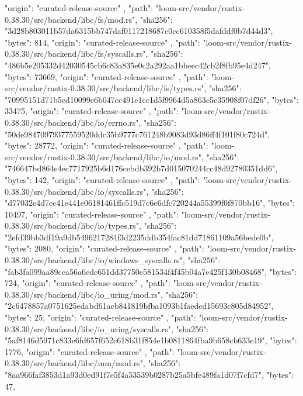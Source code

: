 {{      "origin": "curated-release-source"
    },
    {
      "path": "loom-src/vendor/rustix-0.38.30/src/backend/libc/fs/mod.rs",
      "sha256": "3d28b803011b57da6315bb747daf0117218687c0cc610358f5dafddf0b7d44d3",
      "bytes": 814,
      "origin": "curated-release-source"
    },
    {
      "path": "loom-src/vendor/rustix-0.38.30/src/backend/libc/fs/syscalls.rs",
      "sha256": "486b5e205332d42030545cb6c83a835e0c2a292aa1bbeec42cb2f8fb95e4d247",
      "bytes": 73669,
      "origin": "curated-release-source"
    },
    {
      "path": "loom-src/vendor/rustix-0.38.30/src/backend/libc/fs/types.rs",
      "sha256": "70995151d71b5ed10099e6b047cc491e1cc1d5f9964d5a863c5c35908f07df26",
      "bytes": 33475,
      "origin": "curated-release-source"
    },
    {
      "path": "loom-src/vendor/rustix-0.38.30/src/backend/libc/io/errno.rs",
      "sha256": "50de98470979377559520ddc35b9777c761248b9083d93d86ff4f101f80c724d",
      "bytes": 28772,
      "origin": "curated-release-source"
    },
    {
      "path": "loom-src/vendor/rustix-0.38.30/src/backend/libc/io/mod.rs",
      "sha256": "746647bd864e4ec7717925b6d176cebdb392b7d015070244cc48d92780351dd6",
      "bytes": 142,
      "origin": "curated-release-source"
    },
    {
      "path": "loom-src/vendor/rustix-0.38.30/src/backend/libc/io/syscalls.rs",
      "sha256": "d77032e4d7ec41e441e06181461ffc519d7c6e6dfc720244a55399f0f870bb16",
      "bytes": 10497,
      "origin": "curated-release-source"
    },
    {
      "path": "loom-src/vendor/rustix-0.38.30/src/backend/libc/io/types.rs",
      "sha256": "2efd39bb3df19a9db5496217284f3d2235ddb354fac81dd71861109a56bede0b",
      "bytes": 2080,
      "origin": "curated-release-source"
    },
    {
      "path": "loom-src/vendor/rustix-0.38.30/src/backend/libc/io/windows_syscalls.rs",
      "sha256": "fab3fa099aa89cea56a6edc651dd37750e581534f4f45b04a7e425f130b08468",
      "bytes": 724,
      "origin": "curated-release-source"
    },
    {
      "path": "loom-src/vendor/rustix-0.38.30/src/backend/libc/io_uring/mod.rs",
      "sha256": "2c6478857a0751625edabd61acb841819bfba1093b1faeded15693c805d84952",
      "bytes": 25,
      "origin": "curated-release-source"
    },
    {
      "path": "loom-src/vendor/rustix-0.38.30/src/backend/libc/io_uring/syscalls.rs",
      "sha256": "5af8146d5971c833e6fd657f652c618b31f854e1b0811864fba9b658cb633e19",
      "bytes": 1776,
      "origin": "curated-release-source"
    },
    {
      "path": "loom-src/vendor/rustix-0.38.30/src/backend/libc/mm/mod.rs",
      "sha256": "8aa966faf3853d1a93d0ed91f7e5f4a53539b0287b25a5bfe489fa1d07f7cfd7",
      "bytes": 47,
}}

